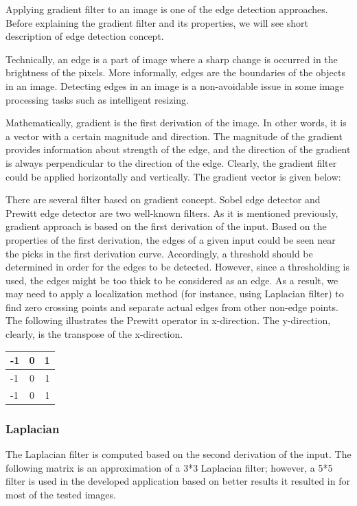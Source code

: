 \documentclass{article}
\begin{document}
			Applying gradient filter to an image is one of the edge detection approaches. Before explaining the gradient filter and its properties, we will see
			short description of edge detection concept. 
			
			Technically, an edge is a part of image where a sharp change is occurred in the brightness of the pixels.
			More informally, edges are the boundaries of
			the objects in an image. Detecting edges in an image is a non-avoidable issue in some image processing tasks such as intelligent resizing.
			
			Mathematically, gradient is the first derivation of the image. In other words, it is a vector with a certain magnitude and direction. 
			The magnitude of the gradient provides information about strength
			of the edge, and the direction of the gradient is always perpendicular to the direction of the edge. Clearly, the gradient filter could be
			applied horizontally and vertically. The gradient vector is given below:

			There are several filter based on gradient concept. Sobel edge detector and Prewitt edge detector are two well-known filters.
			As it is mentioned previously, gradient approach is based on the first derivation of the input. Based on the properties of
			the first derivation, the edges of a given input could be seen near the picks in the first derivation curve. Accordingly, a threshold should be
			determined in order for the edges to be detected. However, since a thresholding is used, the edges might be too thick to be considered
			as an edge. As a result, we may need to apply a localization method (for instance, using Laplacian filter) to find zero
			crossing points and separate actual edges from other non-edge points. The following illustrates the Prewitt operator in x-direction. The y-direction, clearly, is the transpose of the x-direction.


\begin{center}
 \begin{tabular}{ | l | c | r | }
    \hline
    -1 & 0 & 1 \\ \hline
    -1 & 0 & 1 \\ \hline
    -1 & 0 & 1 \\
    \hline
  \end{tabular}
\end{center}

		
		\subsubsection{Laplacian}
			The Laplacian filter is computed based on the second derivation of the input. The following matrix is an approximation of a 3*3 Laplacian filter; however, a 5*5 filter is used in the developed application based on better results it resulted in for
most of the tested images.
\end{document}
